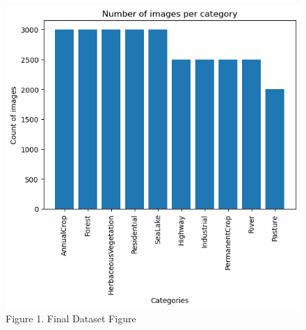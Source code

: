 \documentclass[acmtog]{acmart}
\begin{document}
	\begin{figure}[h]
		\centering
		\includegraphics[scale=0.5]{../src/images/FinalResults/Final_Dataset_figure.png}\\
		Figure 1. Final Dataset Figure
	\end{figure}
	
\end{document}
